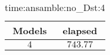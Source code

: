 \begin{table}[!ht]
	\centering
	\begin{tabular}{|c|c|}
		\hline
		Models & elapsed \\ \hline
		$4$ & $743.77$ \\ \hline
	\end{tabular}
	\caption{time:ansamble:no_Dst:4}
	\label{tab:time:ansamble:no_Dst:4}
\end{table}
